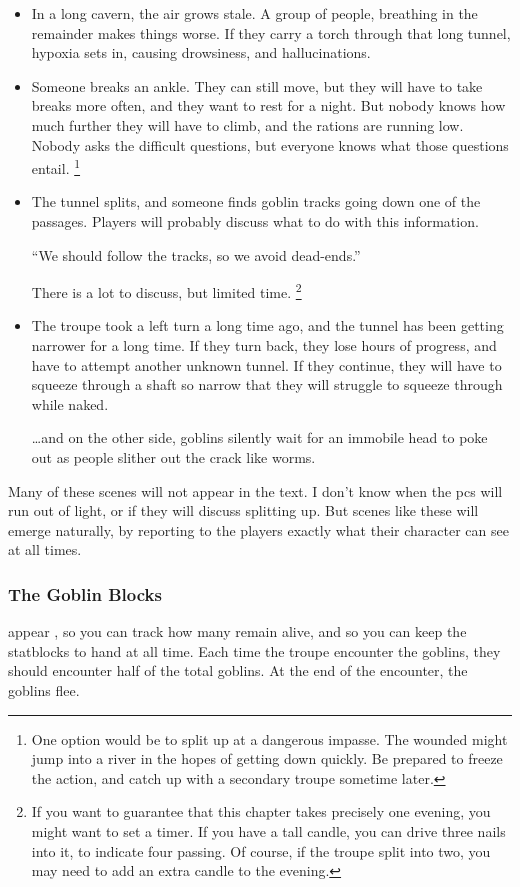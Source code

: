\begin{multicols}{2}
\begin{itemize}
	\item
	In a long cavern, the air grows stale.
	A group of people, breathing in the remainder makes things worse.
	If they carry a torch through that long tunnel, hypoxia sets in, causing drowsiness, and hallucinations.
	\item
	Someone breaks an ankle.
	They can still move, but they will have to take breaks more often, and they want to rest for a night.
	But nobody knows how much further they will have to climb, and the rations are running low.
	Nobody asks the difficult questions, but everyone knows what those questions entail.%
	\footnote{One option would be to split up at a dangerous impasse.
	The wounded might jump into a river in the hopes of getting down quickly.
	Be prepared to freeze the action, and catch up with a secondary troupe sometime later.}
	\item
	The tunnel splits, and someone finds goblin tracks going down one of the passages.
	Players will probably discuss what to do with this information.
	\begin{speechtext}
		``We should follow the tracks, so we avoid dead-ends.''
	\end{speechtext}
	There is a lot to discuss, but limited time.%
	\footnote{If you want to guarantee that this chapter takes precisely one evening, you might want to set a timer.
	If you have a tall candle, you can drive three nails into it, to indicate four  passing.
	Of course, if the troupe split into two, you may need to add an extra candle to the evening.}
	\item
	The troupe took a left turn a long time ago, and the tunnel has been getting narrower for a long time.
	If they turn back, they lose hours of progress, and have to attempt another unknown tunnel.
	If they continue, they will have to squeeze through a shaft so narrow that they will struggle to squeeze through while naked.

	\ldots and on the other side, goblins silently wait for an immobile head to poke out as people slither out the crack like worms.
\end{itemize}

Many of these scenes will not appear in the text.
I don't know when the \glspl{pc} will run out of light, or if they will discuss splitting up.
But scenes like these will emerge naturally, by reporting to the players exactly what their character can see at all times.

\subsubsection{The Goblin Blocks}
appear , so you can track how many remain alive, and so you can keep the \glspl{statblock} to hand at all time.
Each time the troupe encounter the goblins, they should encounter half of the total goblins.
At the end of the encounter, the goblins flee.

\end{multicols}
